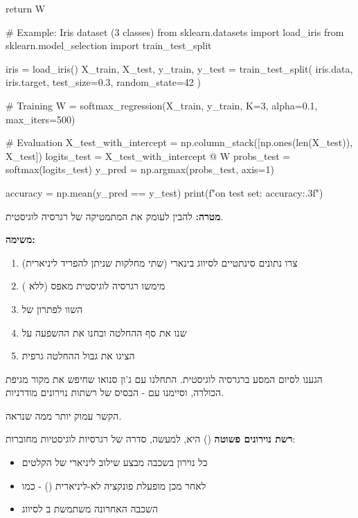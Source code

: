\begin{pythonbox}
    return W

# Example: Iris dataset (3 classes)
from sklearn.datasets import load_iris
from sklearn.model_selection import train_test_split

iris = load_iris()
X_train, X_test, y_train, y_test = train_test_split(
    iris.data, iris.target, test_size=0.3, random_state=42
)

# Training
W = softmax_regression(X_train, y_train, K=3, alpha=0.1, max_iters=500)

# Evaluation
X_test_with_intercept = np.column_stack([np.ones(len(X_test)), X_test])
logits_test = X_test_with_intercept @ W
probs_test = softmax(logits_test)
y_pred = np.argmax(probs_test, axis=1)

accuracy = np.mean(y_pred == y_test)
print(f"\nAccuracy on test set: {accuracy:.3f}")
\end{pythonbox}


\textbf{מטרה:} להבין לעומק את המתמטיקה של רגרסיה לוגיסטית.

\textbf{משימה:}

\begin{enumerate}
\item צרו נתונים סינתטיים לסיווג בינארי (שתי מחלקות שניתן להפריד ליניארית)
\item מימשו רגרסיה לוגיסטית מאפס (ללא )
\item השוו לפתרון של 
\item שנו את סף ההחלטה ובחנו את ההשפעה על 
\item הציגו את גבול ההחלטה גרפית
\end{enumerate}


הגענו לסיום המסע ברגרסיה לוגיסטית. התחלנו עם ג'ון סנואו שחיפש את מקור מגיפת הכולרה, וסיימנו עם  - הבסיס של רשתות נוירונים מודרניות.

הקשר עמוק יותר ממה שנראה.

\textbf{רשת נוירונים פשוטה} () היא, למעשה, סדרה של רגרסיות לוגיסטיות מחוברות:

\begin{itemize}
\item כל נוירון בשכבה מבצע שילוב ליניארי של הקלטים
\item לאחר מכן מופעלת פונקציה לא-ליניארית () - כמו 
\item השכבה האחרונה משתמשת ב לסיווג
\end{itemize}

